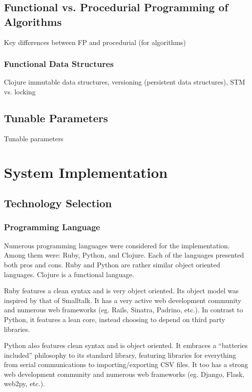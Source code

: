 \documentclass[12pt,letterpaper,oneside]{report}
\theoremstyle{definition}
\begin{document}
		\section{Functional vs. Procedurial Programming of Algorithms}
			Key differences between FP and procedurial (for algorithms)
			
			\subsection{Functional Data Structures}
				Clojure immutable data structures, versioning (persistent data structures), STM vs. locking
			
		\section{Tunable Parameters}
			Tunable parameters
	
	\chapter{System Implementation}
		\section{Technology Selection}
			
			
			\subsection{Programming Language}
				Numerous programming languages were considered for the implementation.  Among them were:  Ruby, Python, and Clojure.  Each of the languages presented both pros and cons.  Ruby and Python are rather similar object oriented languages.  Clojure is a functional language.
				
				Ruby features a clean syntax and is very object oriented.  Its object model was inspired by that of Smalltalk.  It has a very active web development community and numerous web frameworks (eg. Rails, Sinatra, Padrino, etc.).  In contrast to Python, it features a lean core, instead choosing to depend on third party libraries.
				
				Python also features clean syntax and is object oriented.  It embraces a ``batteries included'' philosophy to its standard library, featuring libraries for everything from serial communications to importing/exporting CSV files.  It too has a strong web development community and numerous web frameworks (eg. Django, Flask, web2py, etc.).
				
\end{document}
